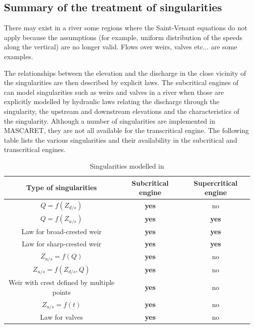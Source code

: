 \subsection{Summary of the treatment of singularities}
\label{BilanSing}

There may exist in a river some regions where the Saint-Venant equations do not apply because the assumptions (for example, uniform distribution of the speeds along the vertical) are no longer valid. Flows over weirs, valves etc... are some examples.

The relationships between the elevation and the discharge in the close vicinity of the singularities are then described by explicit laws. The subcritical engines of \mascaret{} can model singularities such as weirs and valves in a river when those are explicitly modelled by hydraulic laws relating the discharge through the singularity, the upstream and downstream elevations and the characteristics of the singularity. Although a number of singularities are implemented in MASCARET, they are not all available for the transcritical engine. The following table lists the various singularities and their availability in the subcritical and transcritical engines.

\begin{table}[H]
\centering
\caption{Singularities modelled in \mascaret{}}
 \label{TBL2}
\begin{tabular}{c|c|c}
  \textbf{Type of singularities} & \textbf{Subcritical engine} & \textbf{Supercritical engine} \\
  \hline
  $Q=f(Z_{d/s})$ & \textbf{yes} & no \\
  $Q=f(Z_{u/s})$ & \textbf{yes} & \textbf{yes} \\
  Law for broad-crested weir & \textbf{yes} & \textbf{yes} \\
  Law for sharp-crested weir & \textbf{yes} & \textbf{yes} \\
  $Z_{u/s}=f(Q)$ & \textbf{yes} & no \\
  $Z_{u/s}=f(Z_{d/s},Q)$ & \textbf{yes} & no \\
  Weir with crest defined by multiple points & \textbf{yes} & no \\
  $Z_{u/s}=f(t)$ & \textbf{yes} & no \\
  Law for valves & \textbf{yes} & no \\
  \hline
 \end{tabular}
\end{table}

